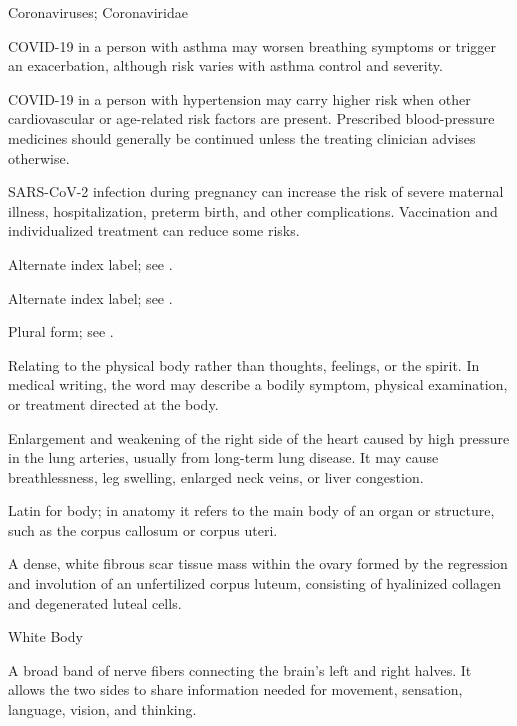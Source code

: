 \synonyms
Coronaviruses; Coronaviridae

 COVID-19 in a person with asthma may worsen breathing symptoms or trigger an exacerbation, although risk varies with asthma control and severity.

 COVID-19 in a person with hypertension may carry higher risk when other cardiovascular or age-related risk factors are present. Prescribed blood-pressure medicines should generally be continued unless the treating clinician advises otherwise.

 SARS-CoV-2 infection during pregnancy can increase the risk of severe maternal illness, hospitalization, preterm birth, and other complications. Vaccination and individualized treatment can reduce some risks.

 Alternate index label; see .

 Alternate index label; see .

 Plural form; see .

 Relating to the physical body rather than thoughts, feelings, or the spirit. In medical writing, the word may describe a bodily symptom, physical examination, or treatment directed at the body.

 Enlargement and weakening of the right side of the heart caused by high pressure in the lung arteries, usually from long-term lung disease. It may cause breathlessness, leg swelling, enlarged neck veins, or liver congestion.

 Latin for body; in anatomy it refers to the main body of an organ or structure, such as the corpus callosum or corpus uteri.

 A dense, white fibrous scar tissue mass within the ovary formed by the regression and involution of an unfertilized corpus luteum, consisting of hyalinized collagen and degenerated luteal cells.

\synonyms
White Body

 A broad band of nerve fibers connecting the brain's left and right halves. It allows the two sides to share information needed for movement, sensation, language, vision, and thinking.

